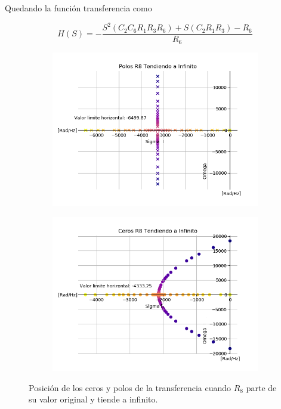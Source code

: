 Quedando la función transferencia como

\begin{equation}
H(S) = - \frac{S^2 (C_2 C_6 R_1 R_3 R_6) + S (C_2 R_1 R_3) - R_6}{R_6}
\label{eq:r8a0}
\end{equation}

\begin{figure}[H]
	\centering
	\begin{subfigure}[t]{0.49\textwidth}
	\hspace*{-2cm}
	\centering
		\includegraphics[width=1.1\textwidth]{Imagenes/polosr8ainf.png}
	\end{subfigure}
	\begin{subfigure}[t]{0.49\textwidth}
	\centering
		\includegraphics[width=1.1\textwidth]{Imagenes/cerosr8ainf.png}
	\end{subfigure}
	\caption{Posición de los ceros y polos de la transferencia cuando $R_8$ parte de su valor original y tiende a infinito.}
	\label{fig:r8ainf}
\end{figure}

